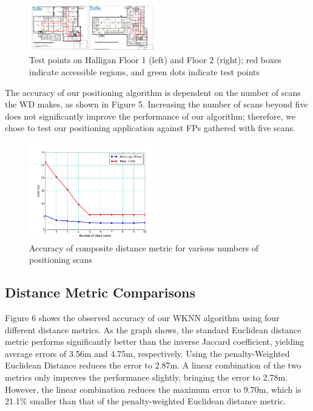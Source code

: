 \documentclass[conference]{IEEEtran}
\begin{document}
\begin{figure}[h!]
  \centering
    \includegraphics[width=0.5\textwidth]{testpoints}
   \caption{Test points on Halligan Floor 1 (left) and Floor 2 (right); red boxes indicate accessible regions, and green dots indicate test points}
\end{figure}

The accuracy of our positioning algorithm is dependent on the number of scans the WD makes, as shown in Figure 5. Increasing the number of scans beyond five does not significantly improve the performance of our algorithm; therefore, we chose to test our positioning application against FPs gathered with five scans.

\begin{figure}[h!]
  \centering
    \includegraphics[width=0.5\textwidth]{pull_errors.png}
   \caption{Accuracy of composite distance metric for various numbers of positioning scans}
\end{figure}

\subsection{Distance Metric Comparisons}
Figure 6 shows the observed accuracy of our WKNN algorithm using four different distance metrics. As the graph shows, the standard Euclidean distance metric performs significantly better than the inverse Jaccard coefficient, yielding average errors of 3.56m and 4.75m, respectively. Using the penalty-Weighted Euclidean Distance reduces the error to 2.87m. A linear combination of the two metrics only improves the performance slightly, bringing the error to 2.78m. However, the linear combination reduces the maximum error to 9.70m, which is 21.1\% smaller than that of the penalty-weighted Euclidean distance metric.
\end{document}

